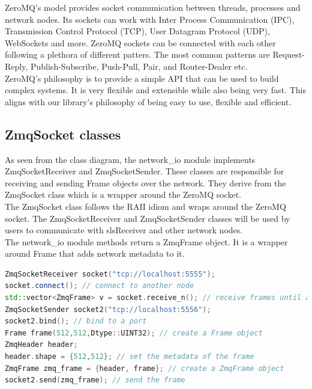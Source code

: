 \documentclass[./chapitre3.tex]{subfiles}
\begin{document}
ZeroMQ's model provides socket communication between threads, processes and network nodes.
Its sockets can work with Inter Process Communication (IPC), Transmission Control Protocol (TCP),
User Datagram Protocol (UDP), WebSockets and more. ZeroMQ sockets can be connected with each other
following a plethora of different patters. The most common patterns are Request-Reply,
Publish-Subscribe, Push-Pull, Pair, and Router-Dealer etc.\\

ZeroMQ's philosophy is to provide a simple API that can be used to build complex systems.
It is very flexible and extensible while also being very fast. This aligns with our library's
philosophy of being easy to use, flexible and efficient.\\

\subsection{ZmqSocket classes}
As seen from the class diagram, the network\_io module implements ZmqSocketReceiver and ZmqSocketSender.
These classes are responsible for receiving and sending Frame objects over the network. They
derive from the ZmqSocket class which is a wrapper around the ZeroMQ socket.\\

The ZmqSocket class follows the RAII idiom and wraps around the ZeroMQ socket. The ZmqSocketReceiver
and ZmqSocketSender classes will be used by users to communicate with slsReceiver and
other network nodes.\\

The network\_io module methods return a ZmqFrame object. It is a wrapper around Frame that adds
network metadata to it.\\

\begin{lstlisting}[language=C++, caption=Example of using the network\_io module, label=lst:network_io_example]
ZmqSocketReceiver socket("tcp://localhost:5555"); 
socket.connect(); // connect to another node
std::vector<ZmqFrame> v = socket.receive_n(); // receive frames until a stop signal
ZmqSocketSender socket2("tcp://localhost:5556");
socket2.bind(); // bind to a port
Frame frame(512,512,Dtype::UINT32); // create a Frame object
ZmqHeader header;
header.shape = {512,512}; // set the metadata of the frame
ZmqFrame zmq_frame = {header, frame}; // create a ZmqFrame object
socket2.send(zmq_frame); // send the frame
\end{lstlisting}
\end{document}
